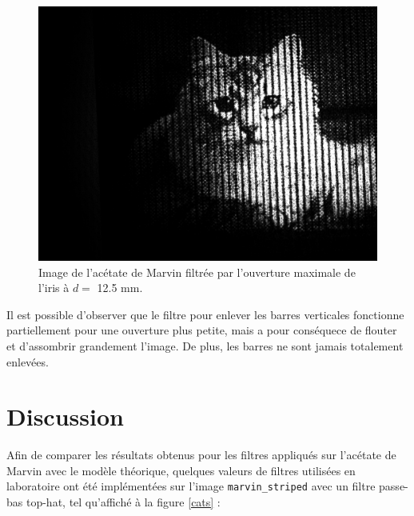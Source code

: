 \documentclass[11pt,letterpaper]{article}
\begin{document}
\begin{figure}[H]
  \centering
  \includegraphics[scale=0.28]{marvin_max_d12-5.png}
  \caption{Image de l'acétate de Marvin filtrée par l'ouverture maximale de l'iris à $d =$ 12.5 mm.}
  \label{marvin_max}
\end{figure}

Il est possible d'observer que le filtre pour enlever les barres verticales fonctionne partiellement pour
une ouverture plus petite, mais a pour conséquece de flouter et d'assombrir grandement l'image. De plus, les 
barres ne sont jamais totalement enlevées.

\section{Discussion}

Afin de comparer les résultats obtenus pour les filtres appliqués sur l'acétate de Marvin avec le modèle théorique,
quelques valeurs de filtres utilisées en laboratoire ont été implémentées sur l'image \texttt{marvin\_striped} avec
un filtre passe-bas top-hat, tel qu'affiché à la figure \ref{cats} :
\end{document}
